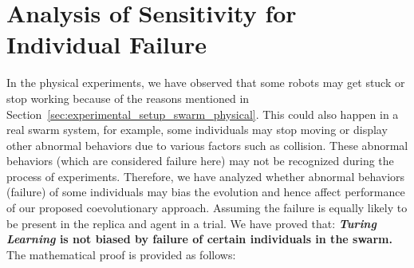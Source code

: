 \section{Analysis of Sensitivity for Individual Failure}\label{sec:analysis_algorithm}

In the physical experiments, we have observed that some robots may get stuck or stop working because of the reasons mentioned in Section~\ref{sec:experimental_setup_swarm_physical}. This could also happen in a real swarm system, for example, some individuals may stop moving or display other abnormal behaviors due to various factors such as collision. These abnormal behaviors (which are considered failure here) may not be recognized during the process of experiments. Therefore, we have analyzed whether abnormal behaviors (failure) of some individuals may bias the evolution and hence affect performance of our proposed coevolutionary approach. Assuming the failure is equally likely to be present in the replica and agent in a trial. We have proved that: \textbf{\textit{Turing Learning} is not biased by failure of certain individuals in the swarm.} The mathematical proof is provided as follows:
 
